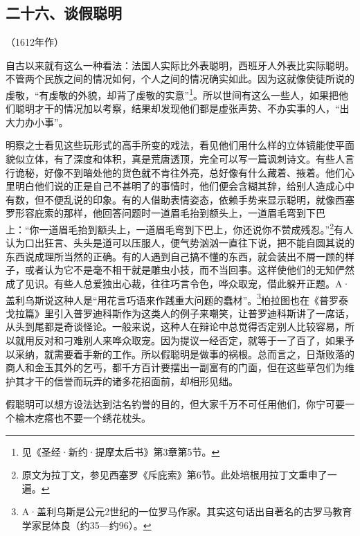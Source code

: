 \subsection*{二十六、谈假聪明}
\begin{center}
    （1612年作）
\end{center}
\par 自古以来就有这么一种看法：法国人实际比外表聪明，西班牙人外表比实际聪明。不管两个民族之间的情况如何，个人之间的情况确实如此。因为这就像使徒所说的虔敬，“有虔敬的外貌，却背了虔敬的实意”\footnote{见《圣经·新约·提摩太后书》第3章第5节。}。所以世间有这么一些人，如果把他们聪明才干的情况加以考察，结果却发现他们都是虚张声势、不办实事的人，“出大力办小事”。
\par 明察之士看见这些玩形式的高手所变的戏法，看见他们用什么样的立体镜能使平面貌似立体，有了深度和体积，真是荒唐透顶，完全可以写一篇讽刺诗文。有些人言行诡秘，好像不到暗处他的货色就不肯往外亮，总好像有什么藏着、掖着。他们心里明白他们说的正是自己不甚明了的事情时，他们便会含糊其辞，给别人造成心中有数，但不便乱说的印象。有的人借助表情姿态，依赖手势来显示聪明，就像西塞罗形容庇索的那样，他回答问题时一道眉毛抬到额头上，一道眉毛弯到下巴上：“你一道眉毛抬到额头上，一道眉毛弯到下巴上，你还说你不赞成残忍。”\footnote{原文为拉丁文，参见西塞罗《斥庇索》第6节。此处培根用拉丁文重申了一遍。}有人认为口出狂言、头头是道可以压服人，便气势汹汹一直往下说，把不能自圆其说的东西说成理所当然的正确。有的人遇到自己搞不懂的东西，就会装出不屑一顾的样子，或者认为它不是毫不相干就是雕虫小技，而不当回事。这样使他们的无知俨然成了见识。有些人总爱独出心裁，往往巧言令色，哗众取宠，借此躲开正题。A·盖利乌斯说这种人是“用花言巧语来作践重大问题的蠢材”。\footnote{A·盖利乌斯是公元2世纪的一位罗马作家。其实这句话出自著名的古罗马教育学家昆体良（约35—约96）。}柏拉图也在《普罗泰戈拉篇》里引入普罗迪科斯作为这类人的例子来嘲笑，让普罗迪科斯讲了一席话，从头到尾都是奇谈怪论。一般来说，这种人在辩论中总觉得否定别人比较容易，所以就用反对和刁难别人来哗众取宠。因为提议一经否定，就等于一了百了，如果予以采纳，就需要着手新的工作。所以假聪明是做事的祸根。总而言之，日渐败落的商人和金玉其外的乞丐，都千方百计要摆出一副富有的门面，但在这些草包们为维护其才干的信誉而玩弄的诸多花招面前，却相形见绌。
\par 假聪明可以想方设法达到沽名钓誉的目的，但大家千万不可任用他们，你宁可要一个榆木疙瘩也不要一个绣花枕头。




